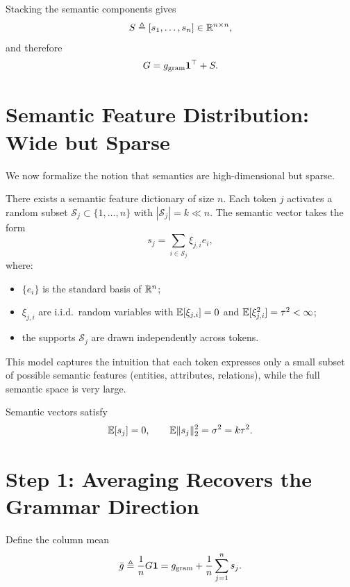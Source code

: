 Stacking the semantic components gives
\[
S \triangleq [s_1,\dots,s_n] \in \mathbb{R}^{n\times n},
\]
and therefore
\begin{equation}
\label{eq:G_decomp}
G = g_{\mathrm{gram}}\mathbf{1}^\top + S.
\end{equation}

\section{Semantic Feature Distribution: Wide but Sparse}

We now formalize the notion that semantics are high-dimensional but sparse.

\begin{assumption}
\label{assump:sparse_semantics}
There exists a semantic feature dictionary of size $n$.
Each token $j$ activates a random subset $\mathcal{S}_j \subset \{1,\dots,n\}$ with
$|\mathcal{S}_j| = k \ll n$.
The semantic vector takes the form
\[
s_j = \sum_{i \in \mathcal{S}_j} \xi_{j,i} e_i,
\]
where:
\begin{itemize}
\item $\{e_i\}$ is the standard basis of $\mathbb{R}^n$;
\item $\xi_{j,i}$ are i.i.d.\ random variables with
      $\mathbb{E}[\xi_{j,i}] = 0$ and $\mathbb{E}[\xi_{j,i}^2] = \tau^2 < \infty$;
\item the supports $\mathcal{S}_j$ are drawn independently across tokens.
\end{itemize}
\end{assumption}

\begin{remark}
This model captures the intuition that each token expresses only a small subset of
possible semantic features (entities, attributes, relations), while the full semantic
space is very large.
\end{remark}

\begin{assumption}
\label{assump:energy}
Semantic vectors satisfy
\[
\mathbb{E}[s_j] = 0,
\qquad
\mathbb{E}\|s_j\|_2^2 = \sigma^2 = k\tau^2.
\]
\end{assumption}

\section{Step 1: Averaging Recovers the Grammar Direction}

Define the column mean
\begin{equation}
\label{eq:col_mean}
\bar g \triangleq \frac{1}{n}G\mathbf{1}
= g_{\mathrm{gram}} + \frac{1}{n}\sum_{j=1}^n s_j.
\end{equation}

